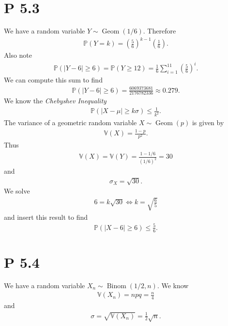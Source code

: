 \documentclass{article}
\renewcommand{\P}{\mathbb{P}}
\newcommand{\V}{\mathbb{V}}
\DeclareMathOperator{\Geom}{Geom}
\DeclareMathOperator{\Binom}{Binom}
\begin{document}
\section*{P 5.3}
We have a random variable $Y\sim\Geom(1/6)$. Therefore 
\begin{align*}
  \P(Y=k) = \left(\frac{5}{6}\right)^{k-1}\left(\frac{1}{6}\right).
\end{align*}
Also note
\begin{align*}
  \P(|Y-6|\geq 6) = \P(Y \geq 12) = \frac{1}{6}\sum_{i=1}^{11} \left(\frac{5}{6}\right)^i.
\end{align*}
We can compute this sum to find
\begin{align*}
  \P(|Y-6|\geq 6) = \frac{6069373681}{2176782336} \approx 0.279.
\end{align*}
We know the \emph{Chebyshev Inequality}
\begin{align*}
  \P(|X-\mu|\geq k\sigma) \leq \frac{1}{k^2}.
\end{align*}
The variance of a geometric random variable $X\sim\Geom(p)$ is given by
\begin{align*}
  \V(X) = \frac{1-p}{p^2}.
\end{align*}
Thus
\begin{align*}
  \V(X) = \V(Y) = \frac{1-1/6}{(1/6)^2} = 30
\end{align*}
and
\begin{align*}
  \sigma_X = \sqrt{30}.
\end{align*}
We solve
\begin{align*}
  6 = k\sqrt{30} \Leftrightarrow k = \sqrt{\frac{6}{5}}
\end{align*}
and insert this result to find
\begin{align*}
  \P(|X-6| \geq 6) \leq \frac{5}{6}.
\end{align*}
\section*{P 5.4}
We have a random variable $X_n\sim\Binom(1/2,n)$. We know
\begin{align*}
  \V(X_n) = npq = \frac{n}{4}
\end{align*}
and 
\begin{align*}
  \sigma = \sqrt{\V(X_n)} = \frac{1}{2}\sqrt{n}.
\end{align*}
\end{document}
